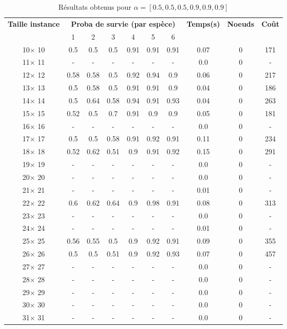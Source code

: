 \documentclass[main.tex]{subfiles}
\begin{document}
\begin{table}
\centering
\caption{Résultats obtenus pour $\alpha = [0.5, 0.5, 0.5, 0.9, 0.9, 0.9]$}
\begin{tabular}{|c||c|c|c|c|c|c||c|c|c|}
\hline
\textbf{Taille instance}&\multicolumn{6}{c}{\textbf{Proba de survie (par espèce)}}&\textbf{Temps(s)}&\textbf{Noeuds}&\textbf{Coût}\\
&1&2&3&4&5&6& & &\\
\hline

10$\times$ 10 &0.5 &0.5 &0.5 &0.91 &0.91 &0.91 &0.07 &0 &171\\
11$\times$ 11 & - & - & - & - & - & - &0.0 &0 &-\\
12$\times$ 12 &0.58 &0.58 &0.5 &0.92 &0.94 &0.9 &0.06 &0 &217\\
13$\times$ 13 &0.5 &0.58 &0.5 &0.91 &0.91 &0.9 &0.04 &0 &186\\
14$\times$ 14 &0.5 &0.64 &0.58 &0.94 &0.91 &0.93 &0.04 &0 &263\\
15$\times$ 15 &0.52 &0.5 &0.7 &0.91 &0.9 &0.9 &0.05 &0 &181\\
16$\times$ 16 & - & - & - & - & - & - &0.0 &0 &-\\
17$\times$ 17 &0.5 &0.5 &0.58 &0.91 &0.92 &0.91 &0.11 &0 &234\\
18$\times$ 18 &0.52 &0.62 &0.51 &0.9 &0.91 &0.92 &0.15 &0 &291\\
19$\times$ 19 & - & - & - & - & - & - &0.0 &0 &-\\
20$\times$ 20 & - & - & - & - & - & - &0.0 &0 &-\\
21$\times$ 21 & - & - & - & - & - & - &0.01 &0 &-\\
22$\times$ 22 &0.6 &0.62 &0.64 &0.9 &0.98 &0.91 &0.08 &0 &313\\
23$\times$ 23 & - & - & - & - & - & - &0.0 &0 &-\\
24$\times$ 24 & - & - & - & - & - & - &0.01 &0 &-\\
25$\times$ 25 &0.56 &0.55 &0.5 &0.9 &0.92 &0.91 &0.09 &0 &355\\
26$\times$ 26 &0.5 &0.5 &0.51 &0.9 &0.92 &0.93 &0.07 &0 &457\\
27$\times$ 27 & - & - & - & - & - & - &0.0 &0 &-\\
28$\times$ 28 & - & - & - & - & - & - &0.0 &0 &-\\
29$\times$ 29 & - & - & - & - & - & - &0.0 &0 &-\\
30$\times$ 30 & - & - & - & - & - & - &0.0 &0 &-\\
31$\times$ 31 & - & - & - & - & - & - &0.0 &0 &-\\

\end{tabular}
\end{table}
\end{document}
